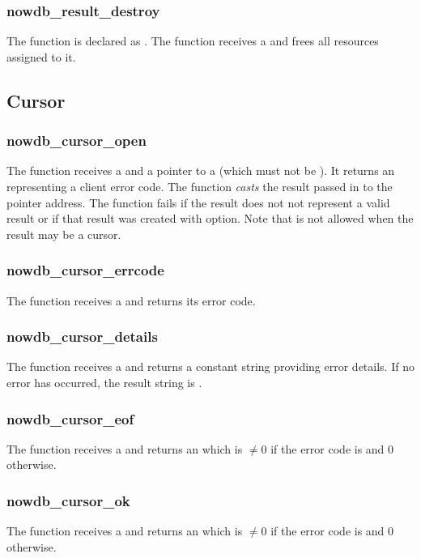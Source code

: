 \subsubsection{nowdb\_result\_destroy}
The function is declared as .
The function receives a 
and frees all resources assigned to it.

\subsection{Cursor}
\subsubsection{nowdb\_cursor\_open}
The function receives a 
and a pointer to a 
(which must not be ).
It returns an  representing
a client error code.
The function \emph{casts} the result
passed in to the pointer address.
The function fails if the result
does not not represent a valid result
or if that result was created
with  option.
Note that 
is not allowed when the result
may be a cursor.

\subsubsection{nowdb\_cursor\_errcode}
The function receives a 
and returns its error code.

\subsubsection{nowdb\_cursor\_details}
The function receives a 
and returns a constant string providing error details.
If no error has occurred, the result string
is .

\subsubsection{nowdb\_cursor\_eof}
The function receives a 
and returns an  which is $\neq 0$
if the error code is 
and 0 otherwise.

\subsubsection{nowdb\_cursor\_ok}
The function receives a 
and returns an  which is $\neq 0$
if the error code is 
and 0 otherwise.

